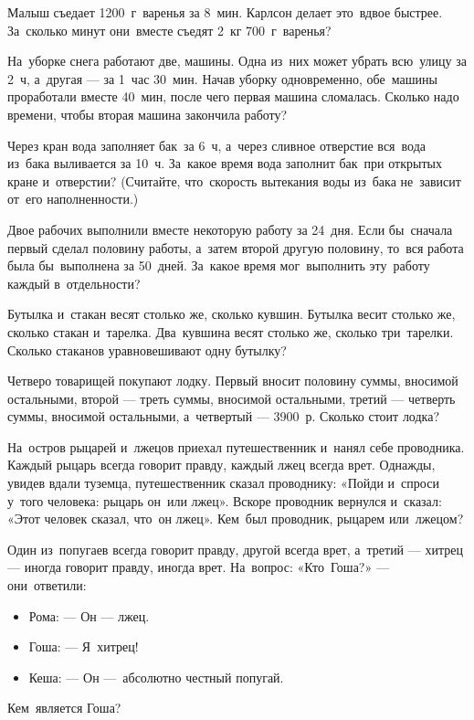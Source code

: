 Малыш съедает 1200~г~варенья за 8~мин. Карлсон делает это~вдвое быстрее. 
За~сколько минут они~вместе съедят 2~кг 700~г~варенья? 

На~уборке снега работают две, машины. Одна из~них может убрать всю~улицу за 2~ч, а~другая — за 1~час 30~мин. 
Начав уборку одновременно, обе~машины проработали вместе 40~мин, после чего первая машина сломалась. 
Сколько надо времени, чтобы вторая машина закончила работу? 

Через кран вода заполняет бак~за 6~ч, а~через сливное отверстие вся~вода из~бака выливается за 10~ч. 
За~какое время вода заполнит бак~при открытых кране и~отверстии? 
(Считайте, что~скорость вытекания воды из~бака не~зависит от~его наполненности.) 

Двое рабочих выполнили вместе некоторую работу за 24~дня. Если бы~сначала первый сделал половину работы, 
а~затем второй другую половину, то~вся работа была бы~выполнена за 50~дней. 
За~какое время мог~выполнить эту~работу каждый в~отдельности? 

Бутылка и~стакан весят столько же, сколько кувшин. Бутылка весит столько же, сколько стакан и~тарелка. 
Два~кувшина весят столько же, сколько три~тарелки. Сколько стаканов уравновешивают одну бутылку? 

Четверо товарищей покупают лодку. Первый вносит половину суммы, вносимой остальными, второй — треть суммы, 
вносимой остальными, третий — четверть суммы, вносимой остальными, а~четвертый — 3900~р. Сколько стоит лодка? 

На~остров рыцарей и~лжецов приехал путешественник и~нанял себе проводника. 
Каждый рыцарь всегда говорит правду, каждый лжец всегда врет. 
Однажды, увидев вдали туземца, путешественник сказал проводнику: «Пойди и~спроси у~того человека: рыцарь он~или лжец». 
Вскоре проводник вернулся и~сказал: «Этот человек сказал, что~он лжец». Кем~был проводник, рыцарем или~лжецом?

Один из~попугаев всегда говорит правду, другой всегда врет, а~третий — хитрец — иногда говорит правду, иногда врет. 
На~вопрос: «Кто~Гоша?» — они~ответили:
\begin{itemize}
    \item Рома: — Он — лжец.
    \item Гоша: — Я~хитрец!
    \item Кеша: — Он — абсолютно честный попугай.
\end{itemize}
Кем~является Гоша?

